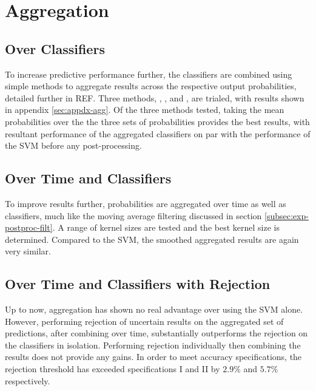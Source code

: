 \section{Aggregation}
\label{sec:exp-agg}

    \subsection{Over Classifiers}
    \label{subsec:exp-agg-clf}
        To increase predictive performance further, the classifiers are combined using simple methods to aggregate results across the respective output probabilities, detailed further in REF. Three methods, , , and , are trialed, with results shown in appendix \ref{sec:appdx-agg}. Of the three methods tested, taking the mean probabilities over the the three sets of probabilities provides the best results, with resultant performance of the aggregated classifiers on par with the performance of the SVM before any post-processing. 
    
    \subsection{Over Time and Classifiers}
    \label{subsec:exp-agg-time}
        To improve results further, probabilities are aggregated over time as well as classifiers, much like the moving average filtering discussed in section \ref{subsec:exp-postproc-filt}. A range of kernel sizes are tested and the best kernel size is determined. Compared to the SVM, the smoothed aggregated results are again very similar.
        
    \subsection{Over Time and Classifiers with Rejection}
    \label{subsec:exp-agg-rej} 
        Up to now, aggregation has shown no real advantage over using the SVM alone. However, performing rejection of uncertain results on the aggregated set of predictions, after combining over time, substantially outperforms the rejection on the classifiers in isolation. Performing rejection individually then combining the results does not provide any gains. In order to meet accuracy specifications, the rejection threshold has exceeded specifications I and II by $2.9\%$ and $5.7\%$ respectively. 
   

